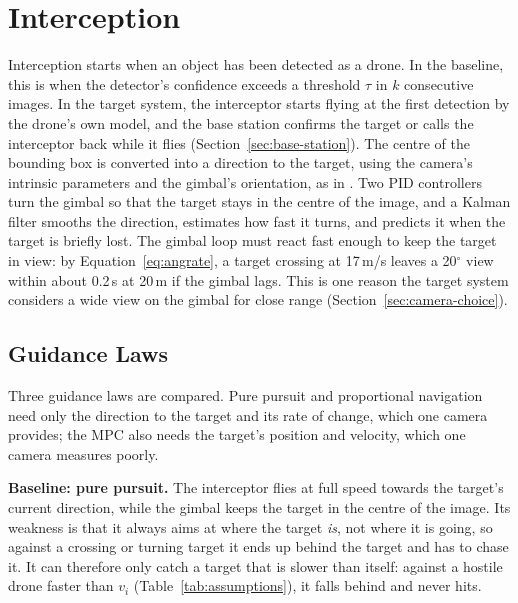 \section{Interception}\label{sec:intercept}
Interception starts when an object has been detected as a drone. In the
baseline, this is when the detector's confidence exceeds a threshold $\tau$
in $k$ consecutive images. In the target system, the interceptor starts
flying at the first detection by the drone's own model, and the base station
confirms the target or calls the interceptor back while it flies
(Section~\ref{sec:base-station}). The centre of the bounding box is converted
into a direction to the target, using the camera's intrinsic parameters and
the gimbal's orientation, as in \cite{zheng2025mcm}. Two PID controllers turn
the gimbal so that the target stays in the centre of the image, and a Kalman
filter smooths the direction, estimates how fast it turns, and predicts it
when the target is briefly lost. The gimbal loop must react fast enough to
keep the target in view: by Equation~\eqref{eq:angrate}, a target crossing at
17\,m/s leaves a 20$^\circ$ view within about 0.2\,s at 20\,m if the gimbal
lags. This is one reason the target system considers a wide view on the
gimbal for close range (Section~\ref{sec:camera-choice}).

\subsection{Guidance Laws}

Three guidance laws are compared. Pure pursuit and proportional navigation
need only the direction to the target and its rate of change, which one
camera provides; the MPC also needs the target's position and velocity, which
one camera measures poorly.

\textbf{Baseline: pure pursuit.} The interceptor flies at full speed towards
the target's current direction, while the gimbal keeps the target in the
centre of the image. Its weakness is that it always aims at where the target
\emph{is}, not where it is going, so against a crossing or turning target it
ends up behind the target and has to chase it. It can therefore only catch a
target that is slower than itself: against a hostile drone faster than $v_i$
(Table~\ref{tab:assumptions}), it falls behind and never hits.

